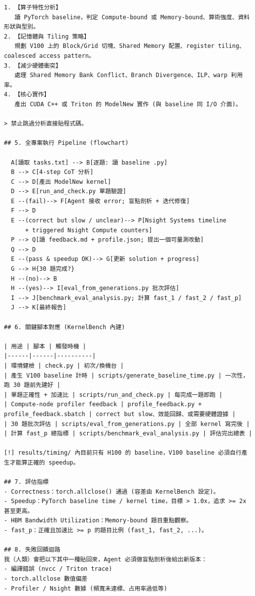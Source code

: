 \documentclass[conference]{IEEEtran}
\begin{document}
\begin{lstlisting}
1. 【算子特性分析】
   讀 PyTorch baseline，判定 Compute-bound 或 Memory-bound、算術強度、資料形狀與型別。
2. 【記憶體與 Tiling 策略】
   規劃 V100 上的 Block/Grid 切塊、Shared Memory 配置、register tiling、coalesced access pattern。
3. 【減少硬體衝突】
   處理 Shared Memory Bank Conflict、Branch Divergence、ILP、warp 利用率。
4. 【核心實作】
   產出 CUDA C++ 或 Triton 的 ModelNew 實作 (與 baseline 同 I/O 介面)。

> 禁止跳過分析直接貼程式碼。

## 5. 全專案執行 Pipeline (flowchart)

  A[讀取 tasks.txt] --> B[逐題: 讀 baseline .py]
  B --> C[4-step CoT 分析]
  C --> D[產出 ModelNew kernel]
  D --> E[run_and_check.py 單題驗證]
  E --(fail)--> F[Agent 接收 error; 盲點剖析 + 迭代修復]
  F --> D
  E --(correct but slow / unclear)--> P[Nsight Systems timeline
      + triggered Nsight Compute counters]
  P --> Q[讀 feedback.md + profile.json; 提出一個可量測改動]
  Q --> D
  E --(pass & speedup OK)--> G[更新 solution + progress]
  G --> H{30 題完成?}
  H --(no)--> B
  H --(yes)--> I[eval_from_generations.py 批次評估]
  I --> J[benchmark_eval_analysis.py; 計算 fast_1 / fast_2 / fast_p]
  J --> K[最終報告]

## 6. 關鍵腳本對應 (KernelBench 內建)

| 用途 | 腳本 | 觸發時機 |
|------|------|----------|
| 環境健檢 | check.py | 初次/換機台 |
| 產生 V100 baseline 計時 | scripts/generate_baseline_time.py | 一次性，跑 30 題前先建好 |
| 單題正確性 + 加速比 | scripts/run_and_check.py | 每完成一題即跑 |
| Compute-node profiler feedback | profile_feedback.py + profile_feedback.sbatch | correct but slow、效能回歸、或需要硬體證據 |
| 30 題批次評估 | scripts/eval_from_generations.py | 全部 kernel 寫完後 |
| 計算 fast_p 總指標 | scripts/benchmark_eval_analysis.py | 評估完出總表 |

[!] results/timing/ 內目前只有 H100 的 baseline，V100 baseline 必須自行產生才能算正確的 speedup。

## 7. 評估指標
- Correctness：torch.allclose() 通過 (容差由 KernelBench 設定)。
- Speedup：PyTorch baseline time / kernel time，目標 > 1.0x，追求 >= 2x 甚至更高。
- HBM Bandwidth Utilization：Memory-bound 題目重點觀察。
- fast_p：正確且加速比 >= p 的題目比例 (fast_1, fast_2, ...)。

## 8. 失敗回饋迴路
我（人類）會把以下其中一種貼回來，Agent 必須做盲點剖析後給出新版本：
- 編譯錯誤 (nvcc / Triton trace)
- torch.allclose 數值偏差
- Profiler / Nsight 數據 (頻寬未達標、占用率過低等)


\end{lstlisting}
\end{document}

